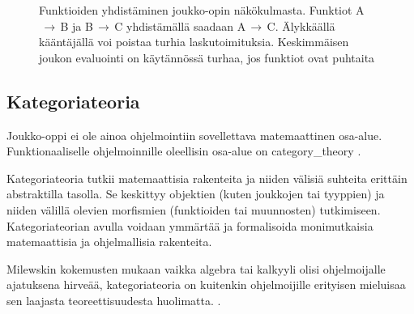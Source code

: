 \begin{figure}[htbp]
    \vspace{10pt}
    \caption{Funktioiden yhdistäminen joukko-opin näkökulmasta. Funktiot A$\,\to\,$B ja B$\,\to\,$C yhdistämällä saadaan A$\,\to\,$C. Älykkäällä kääntäjällä voi poistaa turhia laskutoimituksia. Keskimmäisen joukon evaluointi on käytännössä turhaa, jos funktiot ovat puhtaita}
    \label{fig:function_composition_in_sets}
\end{figure}


\subsection{Kategoriateoria}


Joukko-oppi ei ole ainoa ohjelmointiin sovellettava matemaattinen osa-alue. Funktionaaliselle ohjelmoinnille oleellisin osa-alue on \gls{category_theory} \cite{bartosz_category_for_progamers,promises-spec-94,dear_functional_bros}.

Kategoriateoria tutkii matemaattisia rakenteita ja niiden välisiä suhteita erittäin abstraktilla tasolla. Se keskittyy objektien (kuten joukkojen tai tyyppien) ja niiden välillä olevien morfismien (funktioiden tai muunnosten) tutkimiseen. Kategoriateorian avulla voidaan ymmärtää ja formalisoida monimutkaisia matemaattisia ja ohjelmallisia rakenteita. \citep{bartosz_category_for_progamers,promises-spec-94,category_theory}

Milewskin kokemusten mukaan vaikka algebra tai kalkyyli olisi ohjelmoijalle ajatuksena hirveää, kategoriateoria on kuitenkin ohjelmoijille erityisen mieluisaa sen laajasta teoreettisuudesta huolimatta. \cite[9]{milewski2017category}.

